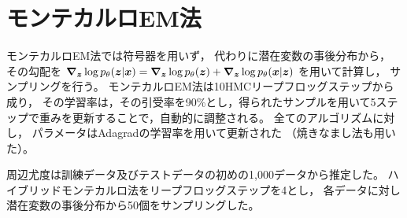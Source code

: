 \documentclass[dvipdfmx, fleqn, draft]{jsarticle}
\begin{document}
\section{モンテカルロEM法}

モンテカルロEM法では符号器を用いず，
代わりに潜在変数の事後分布から，
その勾配を
\(\grad_{\bm{z}} \log{p_{\theta} (\bm{z} | \bm{x})} = \grad_{\bm{z}} \log{p_{\theta} (\bm{z})} + \grad_{\bm{z}} \log{p_{\theta} (\bm{x} | \bm{z})}\)
を用いて計算し，
サンプリングを行う。
モンテカルロEM法は10HMCリープフロッグステップから成り，
その学習率は，その引受率を90{\%}とし，得られたサンプルを用いて5ステップで重みを更新することで，自動的に調整される。
全てのアルゴリズムに対し，
パラメータはAdagradの学習率を用いて更新された
（焼きなまし法も用いた）。

周辺尤度は訓練データ及びテストデータの初めの1,000データから推定した。
ハイブリッドモンテカルロ法をリープフロッグステップを4とし，
各データに対し潜在変数の事後分布から50個をサンプリングした。
\end{document}
